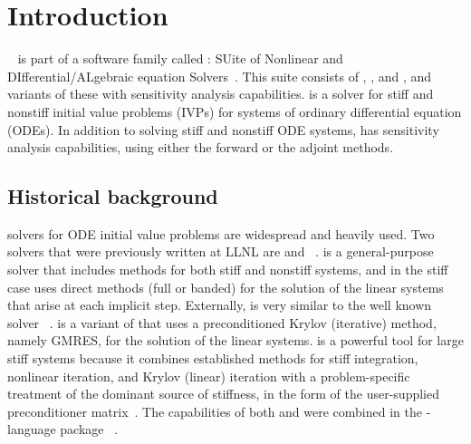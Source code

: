 \chapter{Introduction}\label{s:intro}

{\cvodes}~\cite{SeHi:05} is part of a software family called {\sundials}: 
SUite of Nonlinear and DIfferential/ALgebraic equation Solvers~\cite{HBGLSSW:05}.  
This suite consists of {\cvode}, {\arkode}, {\kinsol} and {\ida}, and variants
of these with sensitivity analysis capabilities.
%
{\cvodes} is a solver for
stiff and nonstiff initial value problems (IVPs) for systems of
ordinary differential equation (ODEs). In addition to solving stiff
and nonstiff ODE systems, {\cvodes} has sensitivity analysis
capabilities, using either the forward or the adjoint methods.

\section{Historical background}\label{ss:history}

 {\F}
solvers for ODE initial value problems are widespread and heavily
used.  Two solvers that were previously written at LLNL are {\vode}
\cite{BBH:89} and {\vodpk}~\cite{Byr:92}.  {\vode}
is a general-purpose solver that includes methods for both stiff and
nonstiff systems, and in the stiff case uses direct methods (full or
banded) for the solution of the linear systems that arise at each
implicit step. Externally, {\vode} is very similar to the well known
solver {\lsode}~\cite{RaHi:94}.
{\vodpk} is a variant of {\vode} that uses a
preconditioned Krylov (iterative) method, namely GMRES, for the
solution of the linear systems. {\vodpk} is a powerful tool for large
stiff systems because it combines established methods for stiff
integration, nonlinear iteration, and Krylov (linear) iteration with a
problem-specific treatment of the dominant source of stiffness, in the
form of the user-supplied preconditioner matrix~\cite{BrHi:89}.  The
capabilities of both {\vode} and {\vodpk} were combined in the
{\C}-language package {\cvode}~\cite{CoHi:94,
CoHi:96}.

